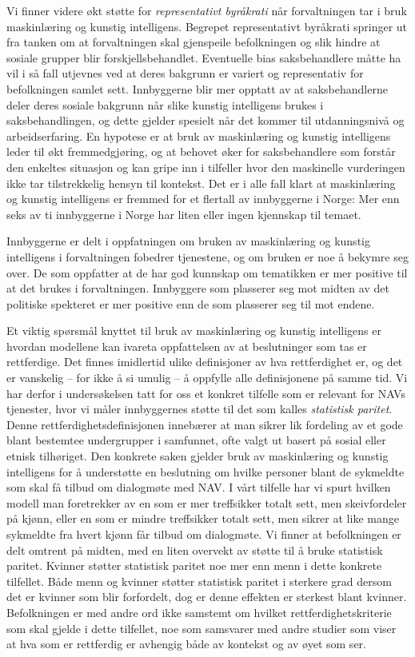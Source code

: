 \documentclass[
  12pt,
  a4paper, 12pt]{article}
\begin{document}
Vi finner videre økt støtte for \emph{representativt byråkrati} når forvaltningen tar i bruk maskinlæring og kunstig intelligens.
Begrepet representativt byråkrati springer ut fra tanken om at forvaltningen skal gjenspeile befolkningen og slik hindre at sosiale grupper blir forskjellsbehandlet.
Eventuelle bias saksbehandlere måtte ha vil i så fall utjevnes ved at deres bakgrunn er variert og representativ for befolkningen samlet sett.
Innbyggerne blir mer opptatt av at saksbehandlerne deler deres sosiale bakgrunn når slike kunstig intelligens brukes i saksbehandlingen, og dette gjelder spesielt når det kommer til utdanningsnivå og arbeidserfaring.
En hypotese er at bruk av maskinlæring og kunstig intelligens leder til økt fremmedgjøring, og at behovet øker for saksbehandlere som forstår den enkeltes situasjon og kan gripe inn i tilfeller hvor den maskinelle vurderingen ikke tar tilstrekkelig hensyn til kontekst.
Det er i alle fall klart at maskinlæring og kunstig intelligens er fremmed for et flertall av innbyggerne i Norge:
Mer enn seks av ti innbyggerne i Norge har liten eller ingen kjennskap til temaet.

Innbyggerne er delt i oppfatningen om bruken av maskinlæring og kunstig intelligens i forvaltningen fobedrer tjenestene, og om bruken er noe å bekymre seg over.
De som oppfatter at de har god kunnskap om tematikken er mer positive til at det brukes i forvaltningen.
Innbyggere som plasserer seg mot midten av det politiske spekteret er mer positive enn de som plasserer seg til mot endene.

Et viktig spørsmål knyttet til bruk av maskinlæring og kunstig intelligens er hvordan modellene kan ivareta oppfattelsen av at beslutninger som tas er rettferdige.
Det finnes imidlertid ulike definisjoner av hva rettferdighet er, og det er vanskelig -- for ikke å si umulig -- å oppfylle alle definisjonene på samme tid.
Vi har derfor i undersøkelsen tatt for oss et konkret tilfelle som er relevant for NAVs tjenester, hvor vi måler innbyggernes støtte til det som kalles \emph{statistisk paritet}.
Denne rettferdighetsdefinisjonen innebærer at man sikrer lik fordeling av et gode blant bestemtee undergrupper i samfunnet, ofte valgt ut basert på sosial eller etnisk tilhøriget.
Den konkrete saken gjelder bruk av maskinlæring og kunstig intelligens for å understøtte en beslutning om hvilke personer blant de sykmeldte som skal få tilbud om dialogmøte med NAV.
I vårt tilfelle har vi spurt hvilken modell man foretrekker av en som er mer treffsikker totalt sett, men skeivfordeler på kjønn, eller en som er mindre treffsikker totalt sett, men sikrer at like mange sykmeldte fra hvert kjønn får tilbud om dialogmøte.
Vi finner at befolkningen er delt omtrent på midten, med en liten overvekt av støtte til å bruke statistisk paritet.
Kvinner støtter statistisk paritet noe mer enn menn i dette konkrete tilfellet.
Både menn og kvinner støtter statistisk paritet i sterkere grad dersom det er kvinner som blir forfordelt, dog er denne effekten er sterkest blant kvinner.
Befolkningen er med andre ord ikke samstemt om hvilket rettferdighetskriterie som skal gjelde i dette tilfellet, noe som samsvarer med andre studier som viser at hva som er rettferdig er avhengig både av kontekst og av øyet som ser.
\end{document}
